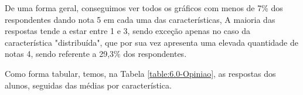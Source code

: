 



De uma forma geral, conseguimos ver todos os gráficos com menos de 7\% dos respondentes dando nota 5 em cada uma das características, A maioria das respostas tende a estar entre 1 e 3, sendo exceção apenas no caso da característica "distribuída", que por sua vez apresenta uma elevada quantidade de notas 4, sendo referente a 29,3\% dos respondentes.

Como forma tabular, temos, na Tabela \ref{table:6.0-Opiniao}, as respostas dos alunos, seguidas das médias por característica.

